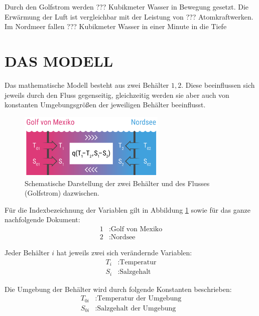 \documentclass[a4paper,twoside]{article}
\begin{document}
Durch den Golfstrom werden ??? Kubikmeter Wasser in Bewegung gesetzt. 
Die Erwärmung der Luft ist vergleichbar mit der Leistung von ??? Atomkraftwerken.
Im Nordmeer fallen ??? Kubikmeter Wasser in einer Minute in die Tiefe
 
	

	
	\section{\uppercase{Das Modell}}\label{sec:Modell}
	
	
	\noindent Das mathematische Modell besteht aus zwei Behälter \(1,2\). Diese beeinflussen sich jeweils durch den Fluss gegenseitig, gleichzeitig werden sie aber auch von konstanten Umgebungsgrößen der jeweiligen Behälter beeinflusst.
	
	\begin{figure}[!h]
  		\centering
 		\includegraphics[width=7cm]{../Diagramme/skizze_modell.png}
  		\caption{Schematische Darstellung der zwei Behälter und des Flusses (Golfstrom) dazwischen.}
  		\label{fig:modell}
	\end{figure}
	
	Für die Indexbezeichnung der Variablen gilt in Abbildung \ref{fig:modell} sowie für das ganze nachfolgende Dokument:
	\begin{align*}
		1 &: \textrm{Golf von Mexiko} \\
		2 &: \textrm{Nordsee}
	\end{align*}

	Jeder Behälter \(i\) hat jeweils zwei sich verändernde Variablen:
	\begin{align*}
		T_i &: \textrm{Temperatur} \\
		S_i &: \textrm{Salzgehalt}
	\end{align*}
	
	Die Umgebung der Behälter wird durch folgende Konstanten beschrieben:
	\begin{align*}
		T_{0i} &: \textrm{Temperatur der Umgebung} \\
		S_{0i} &: \textrm{Salzgehalt der Umgebung}
	\end{align*}
	
\end{document}
